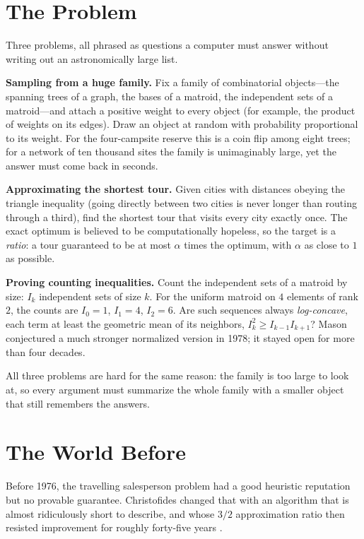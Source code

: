 \section{The Problem}
Three problems, all phrased as questions a computer must answer without writing out an astronomically large list.

\noindent\textbf{Sampling from a huge family.} Fix a family of combinatorial objects---the spanning trees of a graph, the bases of a matroid, the independent sets of a matroid---and attach a positive weight to every object (for example, the product of weights on its edges). Draw an object at random with probability proportional to its weight. For the four-campsite reserve this is a coin flip among eight trees; for a network of ten thousand sites the family is unimaginably large, yet the answer must come back in seconds.

\noindent\textbf{Approximating the shortest tour.} Given cities with distances obeying the triangle inequality (going directly between two cities is never longer than routing through a third), find the shortest tour that visits every city exactly once. The exact optimum is believed to be computationally hopeless, so the target is a \emph{ratio}: a tour guaranteed to be at most $\alpha$ times the optimum, with $\alpha$ as close to $1$ as possible.

\noindent\textbf{Proving counting inequalities.} Count the independent sets of a matroid by size: $I_k$ independent sets of size $k$. For the uniform matroid on $4$ elements of rank $2$, the counts are $I_0=1$, $I_1=4$, $I_2=6$. Are such sequences always \emph{log-concave}, each term at least the geometric mean of its neighbors, $I_k^2\ge I_{k-1}I_{k+1}$? Mason conjectured a much stronger normalized version in 1978; it stayed open for more than four decades.

All three problems are hard for the same reason: the family is too large to look at, so every argument must summarize the whole family with a smaller object that still remembers the answers.

\section{The World Before}
Before 1976, the travelling salesperson problem had a good heuristic reputation but no provable guarantee. Christofides changed that with an algorithm that is almost ridiculously short to describe, and whose $3/2$ approximation ratio then resisted improvement for roughly forty-five years \cite{christofides76}.

